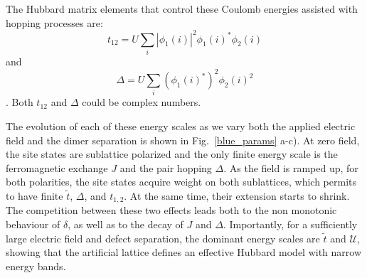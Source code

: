 The Hubbard matrix elements that control these Coulomb energies assisted with hopping processes are: 
$$t_{12}= U \sum_i |\phi_{1}(i)|^2 \phi_1(i)^* \phi_{2}(i)$$
and
$$\Delta= U \sum_i (\phi_{1}(i)^*)^2 \phi_2(i)^2$$.
Both $t_{12}$ and $\Delta$ could be complex numbers.

The evolution of each of these energy scales as we vary both the applied electric field and the dimer separation is shown in Fig.~\ref{blue_params} a-c). At zero field, the site states are sublattice polarized and the only finite energy scale is the ferromagnetic exchange $J$ and the pair hopping $\Delta$. As the field is ramped up, for both polarities, the site states acquire weight on both sublattices, which permits to have finite $\tilde{t}$, $\Delta$, and $t_{1,2}$. At the same time, their extension starts to shrink. The competition between these two effects leads both to the non monotonic behaviour of $\delta$, as well as to the decay of $J$ and $\Delta$. Importantly, for a sufficiently large electric field and defect separation, the dominant energy scales are $\tilde{t}$ and $\mathcal{U}$, showing that the artificial lattice defines an effective Hubbard model with narrow energy bands. 

